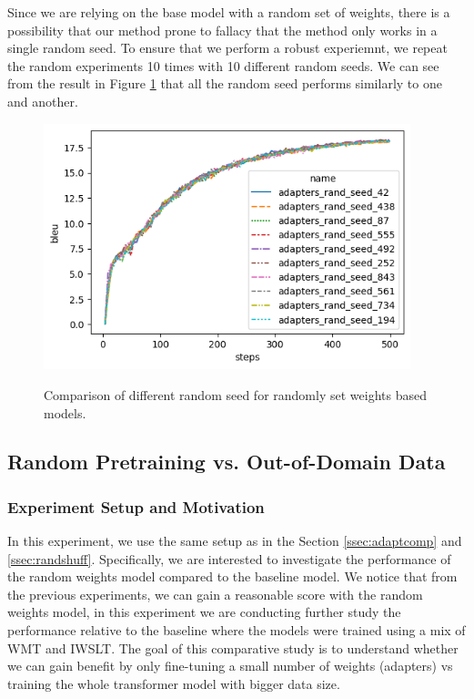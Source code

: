 Since we are relying on the base model with a random set of weights, there is a possibility that our method prone to fallacy that the method only works in a single random seed. To ensure that we perform a robust experiemnt, we repeat the random experiments 10 times with 10 different random seeds. We can see from the result in Figure \ref{img:rndmseed} that all the random seed performs similarly to one and another.

\begin{figure}[h]
    {\includegraphics[width=0.95\textwidth]{img/adapter_random_multiseed.png}}
    \centering
    \caption{Comparison of different random seed for randomly set weights based models.}
    \label{img:rndmseed}
\end{figure}

\subsection{Random Pretraining vs. Out-of-Domain Data}
\label{ssec:randpre}
\subsubsection{Experiment Setup and Motivation}
In this experiment, we use the same setup as in the Section \ref{ssec:adaptcomp} and \ref{ssec:randshuff}. Specifically, we are interested to investigate the performance of the random weights model compared to the baseline model. We notice that from the previous experiments, we can gain a reasonable score with the random weights model, in this experiment we are conducting further study the performance relative to the baseline where the models were trained using a mix of WMT and IWSLT. The goal of this comparative study is to understand whether we can gain benefit by only fine-tuning a small number of weights (adapters) vs training the whole transformer model with bigger data size.

